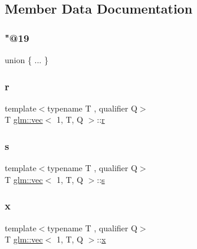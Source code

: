 \subsection{Member Data Documentation}
\mbox{\label{structglm_1_1vec_3_011_00_01_t_00_01_q_01_4_a2851f4411b7dcae87f245ca5129ce828}} 
\subsubsection{\texorpdfstring{"@19}{@19}}
{\footnotesize\ttfamily union \{ ... \} }

\mbox{\label{structglm_1_1vec_3_011_00_01_t_00_01_q_01_4_ad023565c535d96362539e4a4a21eb34c}} 
\subsubsection{\texorpdfstring{r}{r}}
{\footnotesize\ttfamily template$<$typename T , qualifier Q$>$ \\
T \hyperlink{structglm_1_1vec}{glm\+::vec}$<$ 1, T, Q $>$\+::\hyperlink{_s_d_l__opengl_8h_a42ce7cdc612e53abee15043f80220d97}{r}}

\mbox{\label{structglm_1_1vec_3_011_00_01_t_00_01_q_01_4_a8369797bacdb23e8720d4967e1cd5af8}} 
\subsubsection{\texorpdfstring{s}{s}}
{\footnotesize\ttfamily template$<$typename T , qualifier Q$>$ \\
T \hyperlink{structglm_1_1vec}{glm\+::vec}$<$ 1, T, Q $>$\+::\hyperlink{_s_d_l__opengl_8h_a4af680a6c683f88ed67b76f207f2e6e4}{s}}

\mbox{\label{structglm_1_1vec_3_011_00_01_t_00_01_q_01_4_a81767d72ae05f8cf2e904cc16ce924a2}} 
\subsubsection{\texorpdfstring{x}{x}}
{\footnotesize\ttfamily template$<$typename T , qualifier Q$>$ \\
T \hyperlink{structglm_1_1vec}{glm\+::vec}$<$ 1, T, Q $>$\+::\hyperlink{_s_d_l__opengl_8h_ad0e63d0edcdbd3d79554076bf309fd47}{x}}



